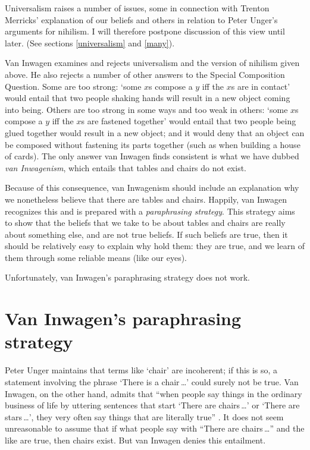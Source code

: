 \documentclass[11pt]{article}
\begin{document}
\begin{spacing}{1.5}
Universalism raises a number of issues, some in connection with
Trenton Merricks' explanation of our beliefs and others in relation to
Peter Unger's arguments for nihilism.  I will therefore postpone
discussion of this view until later.  (See sections \ref{universalism}
and \ref{many}).

Van Inwagen examines and rejects universalism and the version of
nihilism given above.  He also rejects a number of other answers to
the Special Composition Question.  Some are too strong: `some $x$s
compose a $y$ iff the $x$s are in contact' would entail that two
people shaking hands will result in a new object coming into being.
Others are too strong in some ways and too weak in others: `some $x$s
compose a $y$ iff the $x$s are fastened together' would entail that
two people being glued together would result in a new object; and it
would deny that an object can be composed without fastening its parts
together (such as when building a house of cards).  The only answer
van Inwagen finds consistent is what we have dubbed {\em van
  Inwagenism}, which entails that tables and chairs do not exist.

Because of this consequence, van Inwagenism should include an
explanation why we nonetheless believe that there are tables and
chairs.  Happily, van Inwagen recognizes this and is prepared with a
{\em paraphrasing strategy}.  This strategy aims to show that the
beliefs that we take to be about tables and chairs are really about
something else, and are not true beliefs.  If such beliefs are true,
then it should be relatively easy to explain why hold them: they are
true, and we learn of them through some reliable means (like our
eyes).

Unfortunately, van Inwagen's paraphrasing strategy does not work.

\section{Van Inwagen's paraphrasing strategy}
\label{inwagen}
Peter Unger maintains that terms like `chair' are incoherent; if this
is so, a statement involving the phrase `There is a chair\,\ldots '
could surely not be true.  Van Inwagen, on the other hand, admits that
``when people say things in the ordinary business of life by uttering
sentences that start `There are chairs\,\ldots ' or `There are
stars\,\ldots ', they very often say things that are literally true''
\cite[102]{inwagen1995}.  It does not seem unreasonable to assume that
if what people say with ``There are chairs\,\ldots '' and the like are
true, then chairs exist.  But van Inwagen denies this entailment.


\end{spacing}
\end{document}
